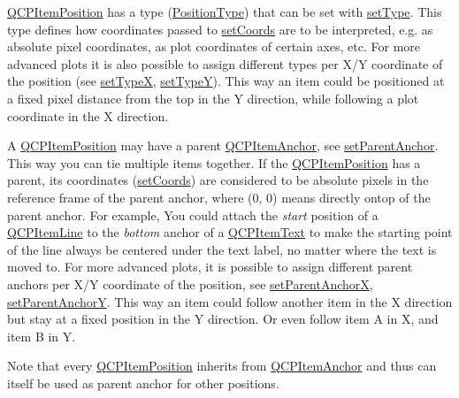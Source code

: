 \mbox{\hyperlink{class_q_c_p_item_position}{Q\+C\+P\+Item\+Position}} has a type (\mbox{\hyperlink{class_q_c_p_item_position_aad9936c22bf43e3d358552f6e86dbdc8}{Position\+Type}}) that can be set with \mbox{\hyperlink{class_q_c_p_item_position_aa476abf71ed8fa4c537457ebb1a754ad}{set\+Type}}. This type defines how coordinates passed to \mbox{\hyperlink{class_q_c_p_item_position_aa988ba4e87ab684c9021017dcaba945f}{set\+Coords}} are to be interpreted, e.\+g. as absolute pixel coordinates, as plot coordinates of certain axes, etc. For more advanced plots it is also possible to assign different types per X/Y coordinate of the position (see \mbox{\hyperlink{class_q_c_p_item_position_a2113b2351d6d00457fb3559a4e20c3ea}{set\+TypeX}}, \mbox{\hyperlink{class_q_c_p_item_position_ac2a454aa5a54c1615c50686601ec4510}{set\+TypeY}}). This way an item could be positioned at a fixed pixel distance from the top in the Y direction, while following a plot coordinate in the X direction.

A \mbox{\hyperlink{class_q_c_p_item_position}{Q\+C\+P\+Item\+Position}} may have a parent \mbox{\hyperlink{class_q_c_p_item_anchor}{Q\+C\+P\+Item\+Anchor}}, see \mbox{\hyperlink{class_q_c_p_item_position_ac094d67a95d2dceafa0d50b9db3a7e51}{set\+Parent\+Anchor}}. This way you can tie multiple items together. If the \mbox{\hyperlink{class_q_c_p_item_position}{Q\+C\+P\+Item\+Position}} has a parent, its coordinates (\mbox{\hyperlink{class_q_c_p_item_position_aa988ba4e87ab684c9021017dcaba945f}{set\+Coords}}) are considered to be absolute pixels in the reference frame of the parent anchor, where (0, 0) means directly ontop of the parent anchor. For example, You could attach the {\itshape start} position of a \mbox{\hyperlink{class_q_c_p_item_line}{Q\+C\+P\+Item\+Line}} to the {\itshape bottom} anchor of a \mbox{\hyperlink{class_q_c_p_item_text}{Q\+C\+P\+Item\+Text}} to make the starting point of the line always be centered under the text label, no matter where the text is moved to. For more advanced plots, it is possible to assign different parent anchors per X/Y coordinate of the position, see \mbox{\hyperlink{class_q_c_p_item_position_add71461a973927c74e42179480916d9c}{set\+Parent\+AnchorX}}, \mbox{\hyperlink{class_q_c_p_item_position_add5ec1db9d19cec58a3b5c9e0a0c3f9d}{set\+Parent\+AnchorY}}. This way an item could follow another item in the X direction but stay at a fixed position in the Y direction. Or even follow item A in X, and item B in Y.

Note that every \mbox{\hyperlink{class_q_c_p_item_position}{Q\+C\+P\+Item\+Position}} inherits from \mbox{\hyperlink{class_q_c_p_item_anchor}{Q\+C\+P\+Item\+Anchor}} and thus can itself be used as parent anchor for other positions.

